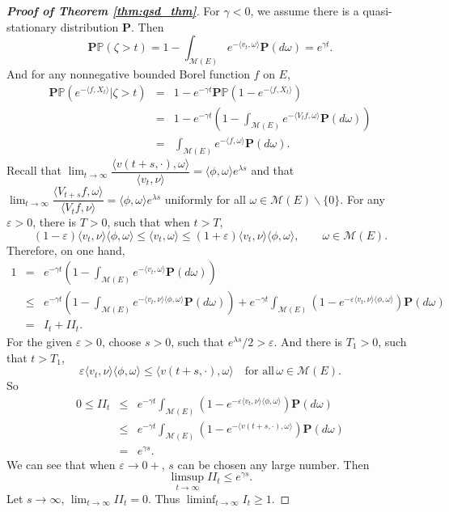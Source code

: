 \documentclass[12pt,a4paper]{amsart}
\numberwithin{equation}{section}
\theoremstyle{plain}
\theoremstyle{definition}
\begin{document}
\begin{proof}[{\bf Proof of Theorem \ref{thm:qsd_thm}}]
  For $\gamma<0$, we assume there is a quasi-stationary distribution $\mathbf P$.  Then
  \[
    \mathbf P\mathbb P(\zeta>t)=1-\int_{\mathcal M(E)}e^{-\langle v_t,\omega\rangle }\mathbf P(d\omega)=e^{\gamma t}.
  \]
  And for any nonnegative bounded Borel function $f$ on $E$,
  \begin{eqnarray*}
    \mathbf P\mathbb P\left(e^{-\langle f, X_t\rangle }\big|\zeta>t\right)&=&1-e^{-\gamma t}\mathbf P\mathbb P\left(1-e^{-\langle f, X_t\rangle }\right)\\
                                                                          &=&1-e^{-\gamma t}\left(1-\int_{\mathcal M(E)}e^{-\langle V_tf,\omega\rangle }\mathbf P(d\omega)\right)\\
                                                                          &=&\int_{\mathcal M(E)}e^{-\langle f,\omega\rangle }\mathbf P(d\omega).
  \end{eqnarray*}
  Recall that $\lim_{t\rightarrow\infty}\dfrac{\langle v(t+s,\cdot),\omega\rangle }{\langle v_t,\nu\rangle }=\langle \phi,\omega\rangle e^{\lambda s} $ and that $\lim_{t\rightarrow\infty}\dfrac{\langle V_{t+s}f,\omega\rangle }{\langle V_tf,\nu\rangle }=\langle \phi,\omega\rangle e^{\lambda s}$ uniformly for all $\omega\in \mathcal M(E)\backslash\{0\}$.  For any $\varepsilon>0$, there is $T>0$, such that when $t>T$,
  \[
    (1-\varepsilon)\langle v_t,\nu\rangle \langle \phi,\omega\rangle\leq \langle v_t,\omega\rangle\leq (1+\varepsilon)\langle v_t,\nu\rangle \langle \phi,\omega\rangle,\qquad \omega\in\mathcal M(E).
  \]
  Therefore, on one hand,
  \begin{eqnarray*}
    1&=&e^{-\gamma t}\left(1-\int_{\mathcal M(E)}e^{-\langle v_t,\omega\rangle }\mathbf P(d\omega)\right)\\
     &\leq &e^{-\gamma t}\left(1-\int_{\mathcal M(E)}e^{-\langle v_t,\nu\rangle\langle\phi,\omega\rangle }\mathbf P(d\omega)\right)+e^{-\gamma t}\int_{\mathcal M(E)}\left(1-e^{-\varepsilon\langle v_t,\nu\rangle\langle\phi,\omega\rangle  }\right)\mathbf P(d\omega)\\
     &=&I_t+II_t.
  \end{eqnarray*}
  For the given $\varepsilon>0$, choose $s>0$, such that $e^{\lambda s}/2>\varepsilon$.  And there is $T_1>0$, such that $t>T_1$,
  \[
    \varepsilon\langle v_t,\nu\rangle\langle\phi,\omega\rangle\leq \langle v(t+s,\cdot),\omega\rangle \quad\mbox{for all}\, \omega\in\mathcal M(E).
  \]
  So
  \begin{eqnarray*}
    0\leq II_t&\leq& e^{-\gamma t}\int_{\mathcal M(E)}\left(1-e^{-\varepsilon\langle v_t,\nu\rangle\langle\phi,\omega\rangle  }\right)\mathbf P(d\omega)\\
              &\leq& e^{-\gamma t}\int_{\mathcal M(E)}\left(1-e^{-\langle v(t+s,\cdot),\omega\rangle  }\right)\mathbf P(d\omega)\\
              &=&e^{\gamma s}.
  \end{eqnarray*}
  We can see that when $\varepsilon\to0+$, $s$ can be chosen any large number.  Then
  \[
    \limsup_{t\to\infty}II_t\leq e^{\gamma s}.
  \]
  Let $s\to\infty$, $\lim_{t\to\infty}II_t=0$. Thus $\liminf_{t\to\infty}I_t\geq 1$.


\end{proof}
\end{document}

